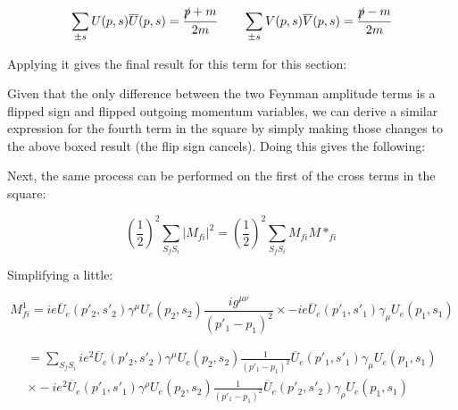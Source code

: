 \documentclass[a4]{article}
\begin{document}
    \begin{equation}
        \sum_{\pm s} U (p, s) \overline{U} (p, s) = \frac{\slashed{p} + m}{2m} \qquad \sum_{\pm s} V (p, s) \overline{V} (p, s) = \frac{\slashed{p} - m}{2m}
    \end{equation}

    Applying it gives the final result for this term for this section:

    \begin{center}
    \end{center}

    Given that the only difference between the two Feynman amplitude terms is a flipped sign and flipped outgoing momentum variables, we can derive a similar expression for the fourth term in the square by simply making those changes
    to the above boxed result (the flip sign cancels). Doing this gives the following:

    \begin{center}
    \end{center}

    Next, the same process can be performed on the first of the cross terms in the square:

    \begin{equation}
        (\frac{1}{2})^2 \sum_{S_f S_i} |M_{f i}|^2 = (\frac{1}{2})^2 \sum_{S_f S_i} M_{fi} M*_{fi}
    \end{equation}

    Simplifying a little:

    \begin{equation}
        M_{fi}^1 = i e \overline{U}_e (p'_2, s'_2) \gamma^{\mu} U_e (p_2, s_2) \frac{i g^{\mu \nu}}{(p'_1 - p_1)^2} \times - i e \overline{U}_e (p'_1, s'_1) \gamma_{\mu} U_e (p_1, s_1)
    \end{equation}

    \begin{eqnarray}
        = \sum_{S_f S_i} i e^2 \overline{U}_e (p'_2, s'_2) \gamma^{\mu} U_e (p_2, s_2) \frac{1}{(p'_1 - p_1)^2} \overline{U}_e (p'_1, s'_1) \gamma_{\mu} U_e (p_1, s_1) \\
        \times - i e^2 \overline{U}_e (p'_1, s'_1) \gamma^{\rho} U_e (p_2, s_2) \frac{1}{(p'_1 - p_1)^2} \overline{U}_e (p'_2, s'_2) \gamma_{\rho} U_e (p_1, s_1)
    \end{eqnarray}
\end{document}
